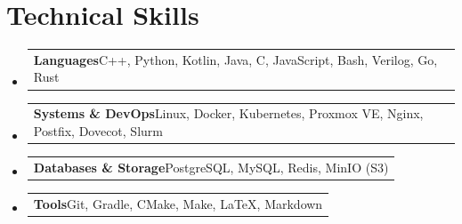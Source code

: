 \documentclass[a4paper,11pt]{article}
\newcommand{\resumeSubHeadingListStart}{\begin{itemize}[leftmargin=*,labelsep=0mm]}
\newcommand{\resumeSubHeadingListEnd}{\end{itemize}\vspace{2mm}}
\newcommand{\resumeSkill}[2]{%
\vspace{0.5mm}\item
    \begin{tabular*}{0.97\textwidth}[t]{l}
        \textbf{#1}\hspace{1.5mm}#2
    \end{tabular*}
    \vspace{-2mm}
}
\begin{document}
\section{\textbf{Technical Skills}}
\resumeSubHeadingListStart
    \resumeSkill{Languages}{C++, Python, Kotlin, Java, C, JavaScript, Bash, Verilog, Go, Rust}
    \resumeSkill{Systems \& DevOps}{Linux, Docker, Kubernetes, Proxmox VE, Nginx, Postfix, Dovecot, Slurm}
    \resumeSkill{Databases \& Storage}{PostgreSQL, MySQL, Redis, MinIO (S3)}
    \resumeSkill{Tools}{Git, Gradle, CMake, Make, LaTeX, Markdown}

\resumeSubHeadingListEnd
\vspace{-16pt}


\end{document}
